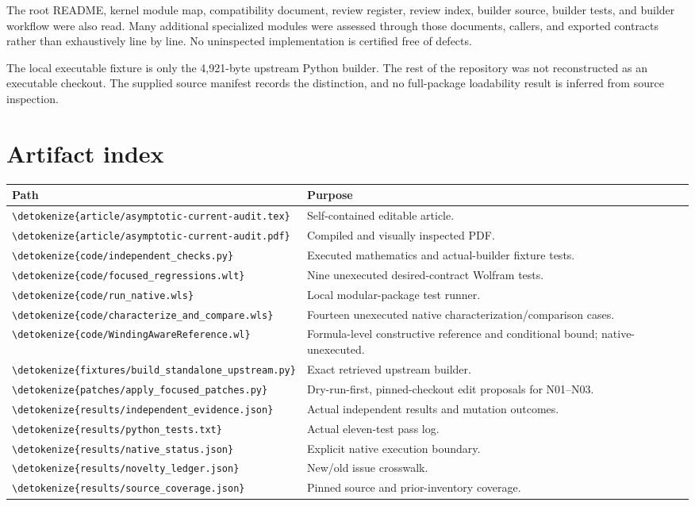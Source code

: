\documentclass[11pt,a4paper]{article}
\newcommand{\wl}[1]{\texttt{\expandafter\nolinkurl\expandafter{\detokenize{#1}}}}
\begin{document}
The root README, kernel module map, compatibility document, review register,
review index, builder source, builder tests, and builder workflow were also read.
Many additional specialized modules were assessed through those documents,
callers, and exported contracts rather than exhaustively line by line. No
uninspected implementation is certified free of defects.

The local executable fixture is only the 4,921-byte upstream Python builder.
The rest of the repository was not reconstructed as an executable checkout.
The supplied source manifest records the distinction, and no full-package
loadability result is inferred from source inspection.

\section{Artifact index}

\begin{longtable}{@{}p{}p{}@{}}
\toprule
Path & Purpose\\
\midrule
\endhead
\wl{article/asymptotic-current-audit.tex} & Self-contained editable article.\\
\wl{article/asymptotic-current-audit.pdf} & Compiled and visually inspected PDF.\\
\wl{code/independent_checks.py} & Executed mathematics and actual-builder fixture tests.\\
\wl{code/focused_regressions.wlt} & Nine unexecuted desired-contract Wolfram tests.\\
\wl{code/run_native.wls} & Local modular-package test runner.\\
\wl{code/characterize_and_compare.wls} & Fourteen unexecuted native characterization/comparison cases.\\
\wl{code/WindingAwareReference.wl} & Formula-level constructive reference and conditional bound; native-unexecuted.\\
\wl{fixtures/build_standalone_upstream.py} & Exact retrieved upstream builder.\\
\wl{patches/apply_focused_patches.py} & Dry-run-first, pinned-checkout edit proposals for N01--N03.\\
\wl{results/independent_evidence.json} & Actual independent results and mutation outcomes.\\
\wl{results/python_tests.txt} & Actual eleven-test pass log.\\
\wl{results/native_status.json} & Explicit native execution boundary.\\
\wl{results/novelty_ledger.json} & New/old issue crosswalk.\\
\wl{results/source_coverage.json} & Pinned source and prior-inventory coverage.\\
\bottomrule
\end{longtable}
\end{document}
